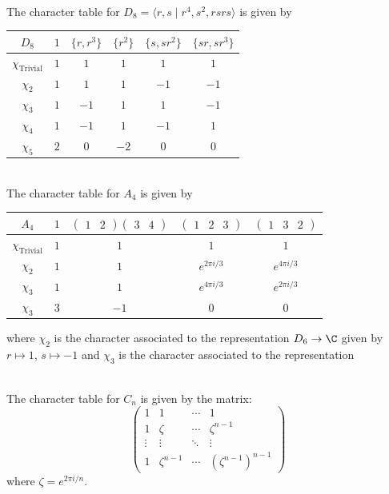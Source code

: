 \documentclass[a4paper]{article}
\begin{document}
\begin{eg}{}{}\\
The character table for $D_8=\langle r,s\;|\;r^4,s^2,rsrs\rangle$ is given by 
\begin{center}
\begin{tabular}{ c|ccccc } 
$D_8$ & $1$ & $\{r,r^3\}$ & $\{r^2\}$ & $\{s,sr^2\}$ & $\{sr,sr^3\}$ \\\hline
$\chi_{\text{Trivial}}$ & $1$ & $1$ & $1$ & $1$ & $1$\\
$\chi_2$ & $1$ & $1$ & $1$ & $-1$ & $-1$\\
$\chi_3$ & $1$ & $-1$ & $1$ & $1$ & $-1$\\
$\chi_4$ & $1$ & $-1$ & $1$ & $-1$ & $1$\\
$\chi_5$ & $2$ & $0$ & $-2$ & $0$ & $0$\\
\end{tabular}
\end{center}
\end{eg}

\begin{eg}{}{}\\
The character table for $A_4$ is given by 
\begin{center}
\begin{tabular}{ c|cccc } 
$A_4$ & $1$ & $\begin{pmatrix}1&2\end{pmatrix}\begin{pmatrix}3 & 4\end{pmatrix}$ & $\begin{pmatrix}1&2&3\end{pmatrix}$ & $\begin{pmatrix}1&3&2\end{pmatrix}$ \\\hline
$\chi_{\text{Trivial}}$ & $1$ & $1$ & $1$ & $1$\\
$\chi_2$ & $1$ & $1$ & $e^{2\pi i/3}$ & $e^{4\pi i/3}$\\
$\chi_3$ & $1$ & $1$ & $e^{4\pi i/3}$ & $e^{2\pi i/3}$\\
$\chi_3$ & $3$ & $-1$ & $0$ & $0$\\
\end{tabular}
\end{center}
where $\chi_2$ is the character associated to the representation $D_6\to\C$ given by $r\mapsto 1$, $s\mapsto -1$ and $\chi_3$ is the character associated to the representation 
\end{eg}

\begin{eg}{}{}\\
The character table for $C_n$ is given by the matrix: $$\begin{pmatrix}
1 & 1 & \cdots & 1\\
1 & \zeta & \cdots & \zeta^{n-1}\\
\vdots & \vdots & \ddots & \vdots\\
1 & \zeta^{n-1} & \cdots & (\zeta^{n-1})^{n-1}
\end{pmatrix}$$ where $\zeta=e^{2\pi i/n}$. 
\end{eg}
\end{document}

